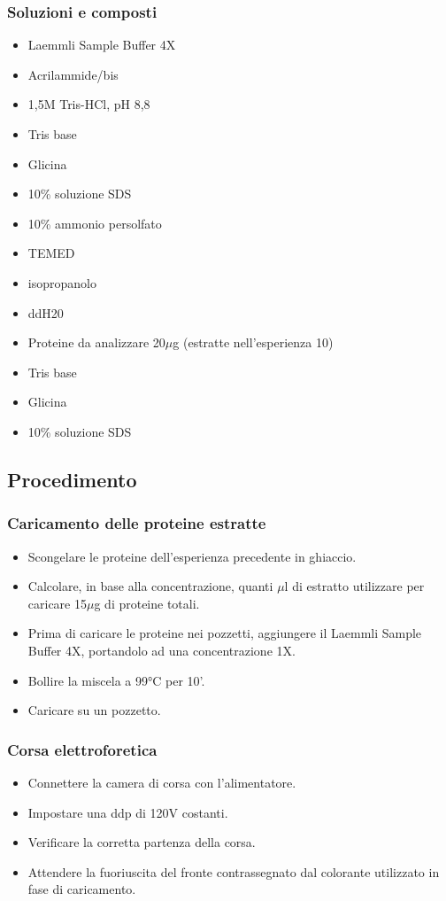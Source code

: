 \subsubsection{Soluzioni e composti}

\begin{itemize}
\item Laemmli Sample Buffer 4X
\item Acrilammide/bis
\item 1,5M Tris-HCl, pH 8,8
\item Tris base
\item Glicina
\item 10\% soluzione SDS
\item 10\% ammonio persolfato
\item TEMED
\item isopropanolo
\item ddH20
\item Proteine da analizzare 20$\mu$g (estratte nell'esperienza 10)
\item Tris base
\item Glicina
\item 10\% soluzione SDS
\end{itemize}


\subsection{Procedimento}

\subsubsection{Caricamento delle proteine estratte}
\begin{itemize}
	\item Scongelare le proteine dell'esperienza precedente in ghiaccio.
	\item Calcolare, in base alla concentrazione, quanti $\mu$l di estratto
	utilizzare per caricare 15$\mu$g di proteine totali.
	\item Prima di caricare le proteine nei pozzetti, aggiungere il Laemmli Sample
	Buffer 4X, portandolo ad una concentrazione 1X.
	\item Bollire la miscela a 99°C per 10'.
	\item Caricare su un pozzetto.
\end{itemize}

\subsubsection{Corsa elettroforetica}
\begin{itemize}
	\item Connettere la camera di corsa con l'alimentatore.
	\item Impostare una ddp di 120V costanti.
	\item Verificare la corretta partenza della corsa.
	\item Attendere la fuoriuscita del fronte contrassegnato dal colorante utilizzato
	in fase di caricamento.
\end{itemize}

